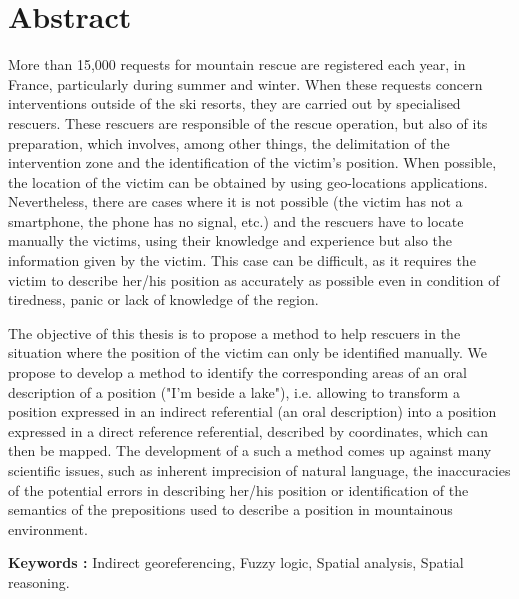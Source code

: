 \section*{Abstract}

More than 15,000 requests for mountain rescue are registered each
year, in France, particularly during summer and winter. When these
requests concern interventions outside of the ski resorts, they are
carried out by specialised rescuers. These rescuers are responsible of
the rescue operation, but also of its preparation, which involves,
among other things, the delimitation of the intervention zone and the
identification of the victim's position. When possible, the location
of the victim can be obtained by using geo-locations
applications. Nevertheless, there are cases where it is not possible
(\eg the victim has not a smartphone, the phone has no signal, etc.)
and the rescuers have to locate manually the victims, using their
knowledge and experience but also the information given by the
victim. This case can be difficult, as it requires the victim to
describe her/his position as accurately as possible even in condition
of tiredness, panic or lack of knowledge of the region.

The objective of this thesis is to propose a method to help rescuers
in the situation where the position of the victim can only be
identified manually. We propose to develop a method to identify the
corresponding areas of an oral description of a position (\eg "I'm
beside a lake"), i.e. allowing to transform a position expressed in an
indirect referential (an oral description) into a position expressed
in a direct reference referential, \ie described by coordinates,
which can then be mapped. The development of a such a method comes up
against many scientific issues, such as inherent imprecision of
natural language, the inaccuracies of the potential errors in
describing her/his position or identification of the semantics of the
prepositions used to describe a position in mountainous environment.

\vspace{.5cm}

\noindent\textbf{Keywords :} Indirect georeferencing, Fuzzy logic,
Spatial analysis, Spatial reasoning.\par
